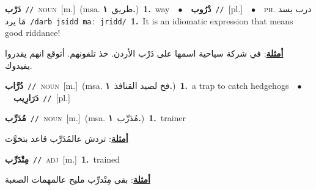 \documentclass[10pt,a4paper,twoside]{article} %
\begin{document}
\begin{multicols}{2}
{\setlength\topsep{0pt}\textbf{\foreignlanguage{arabic}{دَرْب}}\ {\color{gray}\texttt{//}\color{black}}\ \textsc{noun}\ [m.]\ \color{gray}(msa. \foreignlanguage{arabic}{طريق}~\foreignlanguage{arabic}{\textbf{١.}})\color{black}\ \textbf{1.}~way\ \ $\bullet$\ \ \setlength\topsep{0pt}\textbf{\foreignlanguage{arabic}{دْرُوب}}\ {\color{gray}\texttt{//}\color{black}}\ [pl.]\ \ $\bullet$\ \ \textsc{ph.} \color{gray} \foreignlanguage{arabic}{درب يسد مَا يرد}\color{black}\ {\color{gray}\texttt{/{\sffamily darb jsidd maː jridd}/}\color{black}}\ \textbf{1.}~It is an idiomatic expression that means good riddance!\  \begin{flushright}\color{gray}\foreignlanguage{arabic}{\textbf{\underline{\foreignlanguage{arabic}{أمثلة}}}: في شركة سياحية اسمها على دَرْب الأردن. خذ تلفونهم. أتوقع انهم يقدروا يفيدوك.}\end{flushright}\color{black}} \vspace{2mm}

{\setlength\topsep{0pt}\textbf{\foreignlanguage{arabic}{دُرَّاب}}\ {\color{gray}\texttt{//}\color{black}}\ \textsc{noun}\ [m.]\ \color{gray}(msa. \foreignlanguage{arabic}{فخ لصيد القنافذ}~\foreignlanguage{arabic}{\textbf{١.}})\color{black}\ \textbf{1.}~a trap to catch hedgehogs\ \ $\bullet$\ \ \setlength\topsep{0pt}\textbf{\foreignlanguage{arabic}{دَرَارِيب}}\ {\color{gray}\texttt{//}\color{black}}\ [pl.]\ } \vspace{2mm}

{\setlength\topsep{0pt}\textbf{\foreignlanguage{arabic}{مُدَرِّب}}\ {\color{gray}\texttt{//}\color{black}}\ \textsc{noun}\ [m.]\ \color{gray}(msa. \foreignlanguage{arabic}{مُدَرِّب}~\foreignlanguage{arabic}{\textbf{١.}})\color{black}\ \textbf{1.}~trainer\  \begin{flushright}\color{gray}\foreignlanguage{arabic}{\textbf{\underline{\foreignlanguage{arabic}{أمثلة}}}: تردش عالمُدَرِّب قاعد بتخوَّت}\end{flushright}\color{black}} \vspace{2mm}

{\setlength\topsep{0pt}\textbf{\foreignlanguage{arabic}{مِتْدَرِّب}}\ {\color{gray}\texttt{//}\color{black}}\ \textsc{adj}\ [m.]\ \textbf{1.}~trained\  \begin{flushright}\color{gray}\foreignlanguage{arabic}{\textbf{\underline{\foreignlanguage{arabic}{أمثلة}}}: بقى مِتْدرِّب مليح عالمهمات الصعبة}\end{flushright}\color{black}} \vspace{2mm}


\end{multicols}
\end{document}
